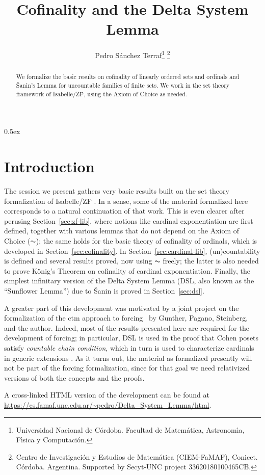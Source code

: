 \documentclass[11pt,a4paper]{article}
\begin{document}
\title{Cofinality and the Delta System Lemma}
\author{
  Pedro S\'anchez Terraf\thanks{Universidad Nacional de C\'ordoba. 
    Facultad de Matem\'atica, Astronom\'{\i}a,  F\'{\i}sica y
    Computaci\'on.}
  \thanks{%
    Centro de Investigaci\'on y Estudios de Matem\'atica
    (CIEM-FaMAF), Conicet. C\'ordoba. Argentina.
    Supported by Secyt-UNC project 33620180100465CB.}
}
\maketitle

\begin{abstract}
  We formalize the basic results on cofinality of linearly ordered
  sets and ordinals and \v{S}anin's Lemma for uncountable families of
  finite sets. We work in the set theory framework of
  Isabelle/ZF, using the Axiom of Choice as needed.
\end{abstract}


\tableofcontents

\parindent 0pt\parskip 0.5ex

\section{Introduction}

The session we present gathers very basic results built on the set
theory formalization of Isabelle/ZF
\cite{DBLP:journals/jar/PaulsonG96}. In a sense, some of the material
formalized here corresponds to a natural continuation of that
work. This is even clearer after perusing Section~\ref{sec:zf-lib},
where notions like cardinal exponentiation are first defined, together
with various lemmas that do not depend on the Axiom of Choice ($\AC$);
the same holds for the basic theory of cofinality of ordinals, which
is developed in Section~\ref{sec:cofinality}. In
Section~\ref{sec:cardinal-lib}, (un)countability is defined
and several results proved, now using $\AC$ freely; the latter is also
needed to prove König's Theorem on cofinality of cardinal
exponentiation. Finally, the simplest infinitary version of the Delta
System Lemma (DSL, also known as the ``Sunflower Lemma'') due to  \v{S}anin
is proved in Section~\ref{sec:dsl}.

A greater part of this development was motivated by a joint project on
the formalization of the ctm approach to
forcing~\cite{2020arXiv200109715G} by Gunther, Pagano, Steinberg, and
the author. Indeed, most of the results presented here are required
for the development of forcing; in particular, DSL is used in the
proof that Cohen posets satisfy \emph{countable chain condition}, which
in turn is used to characterize cardinals in generic extensions
\cite[Chap.~IV]{kunen2011set}. As it turns out, the material as
formalized presently will not be part of the forcing formalization,
since for that goal we need relativized versions of both the
concepts and the proofs.

A cross-linked HTML version of the development can be found at
\url{https://cs.famaf.unc.edu.ar/~pedro/Delta_System_Lemma/html}.





\end{document}
